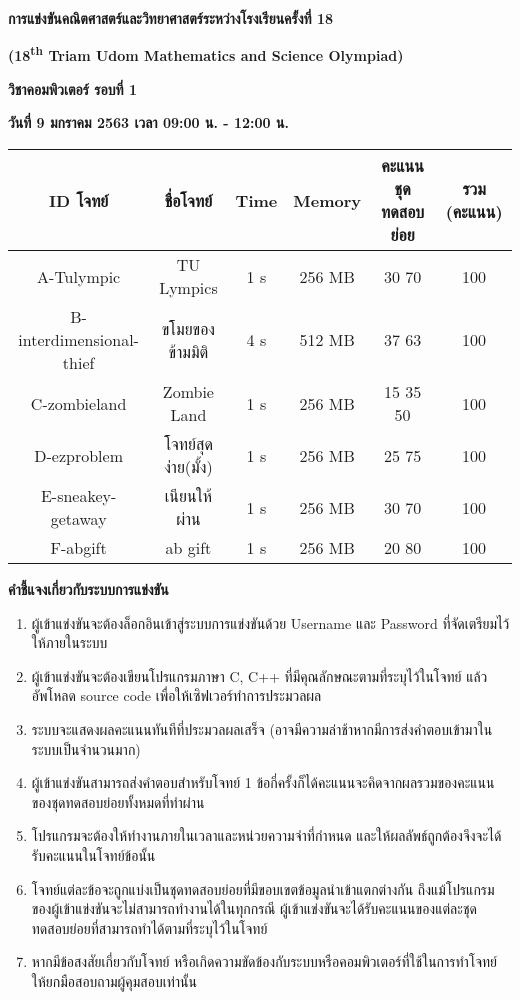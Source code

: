 \documentclass[11pt,a4paper]{article}
\begin{document}
\vspace*{\fill}%
\noindent
\begin{center}
{\Large \textbf{การแข่งขันคณิตศาสตร์และวิทยาศาสตร์ระหว่างโรงเรียนครั้งที่ 18}}

{\Large \textbf{(18\textsuperscript{th} Triam Udom Mathematics and Science Olympiad)}} 

{\Large\textbf{วิชาคอมพิวเตอร์ รอบที่ 1}}

{\Large\textbf{วันที่ 9 มกราคม 2563 เวลา 09:00 น. - 12:00 น.}}

\begin{tabular}{ |c|c|c|c|c|c|  }
  \hline
  \textbf{ID โจทย์} & ชื่อโจทย์ & Time & Memory & คะแนนชุดทดสอบย่อย & รวม (คะแนน)\\
  \hline
  A-Tulympic & TU Lympics & 1 s & 256 MB & 30 70 & 100\\
  B-interdimensional-thief & ขโมยของข้ามมิติ & 4 s & 512 MB & 37 63 & 100\\
  C-zombieland & Zombie Land & 1 s & 256 MB & 15 35 50 & 100\\
  D-ezproblem & โจทย์สุดง่าย(มั้ง) & 1 s & 256 MB & 25 75 & 100\\
  E-sneakey-getaway & เนียนให้ผ่าน & 1 s & 256 MB & 30 70 & 100\\
  F-abgift & ab gift & 1 s & 256 MB & 20 80 & 100\\
  \hline
\end{tabular}

\end{center}
\vfill
\pagebreak

{\Large \textbf{คำชี้แจงเกี่ยวกับระบบการแข่งขัน}}

\begin{enumerate}
  \item ผู้เข้าแข่งขันจะต้องล็อกอินเข้าสู่ระบบการแข่งขันด้วย Username และ Password ที่จัดเตรียมไว้ให้ภายในระบบ
  \item ผู้เข้าแข่งขันจะต้องเขียนโปรแกรมภาษา C, C++ ที่มีคุณลักษณะตามที่ระบุไว้ในโจทย์ แล้วอัพโหลด source code เพื่อให้เซิฟเวอร์ทำการประมวลผล
  \item ระบบจะแสดงผลคะแนนทันทีที่ประมวลผลเสร็จ (อาจมีความล่าช้าหากมีการส่งคำตอบเข้ามาในระบบเป็นจำนวนมาก)
  \item ผู้เข้าแข่งขันสามารถส่งคำตอบสำหรับโจทย์ 1 ข้อกี่ครั้งก็ได้คะแนนจะคิดจากผลรวมของคะแนนของชุดทดสอบย่อยทั้งหมดที่ทำผ่าน
  \item โปรแกรมจะต้องให้ทำงานภายในเวลาและหน่วยความจำที่กำหนด และให้ผลลัพธ์ถูกต้องจึงจะได้รับคะแนนในโจทย์ข้อนั้น 
  \item โจทย์แต่ละข้อจะถูกแบ่งเป็นชุดทดสอบย่อยที่มีขอบเขตข้อมูลนำเข้าแตกต่างกัน ถึงแม้โปรแกรมของผู้เข้าแข่งขันจะไม่สามารถทำงานได้ในทุกกรณี ผู้เข้าแข่งขันจะได้รับคะแนนของแต่ละชุดทดสอบย่อยที่สามารถทำได้ตามที่ระบุไว้ในโจทย์
  \item หากมีข้อสงสัยเกี่ยวกับโจทย์ หรือเกิดความขัดข้องกับระบบหรือคอมพิวเตอร์ที่ใช้ในการทำโจทย์ ให้ยกมือสอบถามผู้คุมสอบเท่านั้น
\end{enumerate}
\end{document}
